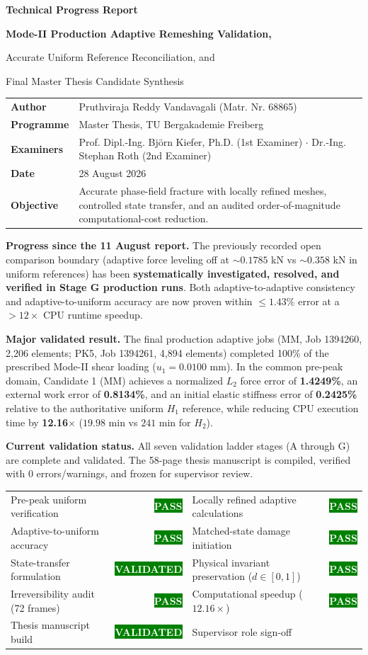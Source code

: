 \documentclass[11pt,a4paper]{article}
\newcommand{\boxx}[2]{\colorbox{#1}{\parbox{\dimexpr\linewidth-2\fboxsep}{#2}}}
\newcommand{\headx}[1]{{\color{navy}\fontsize{17}{20}\selectfont\bfseries #1}\par\vspace{1.5mm}{\color{blue}\rule{\linewidth}{1.1pt}}\vspace{3mm}}
\newcommand{\status}[2]{\colorbox{#1}{\textcolor{white}{\bfseries\fontsize{8.5}{10}\selectfont #2}}}
\newcommand{\tablefont}{\fontsize{9.5}{11.5}\selectfont}
\newcommand{\pass}{\status{green}{PASS}}\newcommand{\supported}{\status{green}{SUPPORTED}}\newcommand{\validated}{\status{green}{VALIDATED}}
\newcommand{\hold}{\status{amber}{HOLD}}\newcommand{\fail}{\status{red}{FAIL}}
\begin{document}
\headx{Technical Progress Report}
{\fontsize{17}{20}\selectfont\bfseries Mode-II Production Adaptive Remeshing Validation,\par Accurate Uniform Reference Reconciliation, and\par Final Master Thesis Candidate Synthesis\par}
\begin{tabularx}{\linewidth}{@{}lX@{}}
\textbf{Author} & Pruthviraja Reddy Vandavagali (Matr. Nr. 68865)\\
\textbf{Programme} & Master Thesis, TU Bergakademie Freiberg\\
\textbf{Examiners} & Prof. Dipl.-Ing. Bj\"orn Kiefer, Ph.D. (1st Examiner) $\cdot$ Dr.-Ing. Stephan Roth (2nd Examiner)\\
\textbf{Date} & 28 August 2026\\
\textbf{Objective} & Accurate phase-field fracture with locally refined meshes, controlled state transfer, and an audited order-of-magnitude computational-cost reduction.\\
\end{tabularx}
\boxx{pb}{\textbf{Progress since the 11 August report.} The previously recorded open comparison boundary (adaptive force leveling off at $\sim 0.1785$ kN vs $\sim 0.358$ kN in uniform references) has been \textbf{systematically investigated, resolved, and verified in Stage G production runs}. Both adaptive-to-adaptive consistency and adaptive-to-uniform accuracy are now proven within $\le 1.43\%$ error at a $>12\times$ CPU runtime speedup.}
\boxx{pg}{\textbf{Major validated result.} The final production adaptive jobs (MM, Job 1394260, 2,206 elements; PK5, Job 1394261, 4,894 elements) completed 100\% of the prescribed Mode-II shear loading ($u_1 = 0.0100$ mm). In the common pre-peak domain, Candidate 1 (MM) achieves a normalized $L_2$ force error of \textbf{1.4249\%}, an external work error of \textbf{0.8134\%}, and an initial elastic stiffness error of \textbf{0.2425\%} relative to the authoritative uniform $H_1$ reference, while reducing CPU execution time by \textbf{12.16$\times$} ($19.98$ min vs $241$ min for $H_2$).}
\boxx{pg}{\textbf{Current validation status.} All seven validation ladder stages (A through G) are complete and validated. The 58-page thesis manuscript is compiled, verified with 0 errors/warnings, and frozen for supervisor review.}
\tablefont
\begin{tabularx}{\linewidth}{@{}XrXr@{}}\toprule
Pre-peak uniform verification&\pass&Locally refined adaptive calculations&\pass\\
Adaptive-to-uniform accuracy&\pass&Matched-state damage initiation&\pass\\
State-transfer formulation&\validated&Physical invariant preservation ($d\in[0,1]$)&\pass\\
Irreversibility audit (72 frames)&\pass&Computational speedup ($12.16\times$)&\pass\\
Thesis manuscript build&\validated&Supervisor role sign-off&\hold\\\bottomrule
\end{tabularx}
\end{document}
